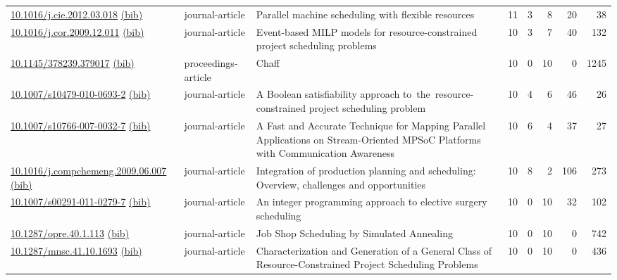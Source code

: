 {\begin{longtable}{p{5cm}lp{11cm}rrrrr}
\href{http://dx.doi.org/10.1016/j.cie.2012.03.018}{10.1016/j.cie.2012.03.018} \href{https://www.doi2bib.org/bib/10.1016/j.cie.2012.03.018}{(bib)} & journal-article & Parallel machine scheduling with flexible resources & 11 & 3 & 8 & 20 & 38 \\
\href{http://dx.doi.org/10.1016/j.cor.2009.12.011}{10.1016/j.cor.2009.12.011} \href{https://www.doi2bib.org/bib/10.1016/j.cor.2009.12.011}{(bib)} & journal-article & Event-based MILP models for resource-constrained project scheduling problems & 10 & 3 & 7 & 40 & 132 \\
\href{http://dx.doi.org/10.1145/378239.379017}{10.1145/378239.379017} \href{https://www.doi2bib.org/bib/10.1145/378239.379017}{(bib)} & proceedings-article & Chaff & 10 & 0 & 10 & 0 & 1245 \\
\href{http://dx.doi.org/10.1007/s10479-010-0693-2}{10.1007/s10479-010-0693-2} \href{https://www.doi2bib.org/bib/10.1007/s10479-010-0693-2}{(bib)} & journal-article & A Boolean satisfiability approach to the resource-constrained project scheduling problem & 10 & 4 & 6 & 46 & 26 \\
\href{http://dx.doi.org/10.1007/s10766-007-0032-7}{10.1007/s10766-007-0032-7} \href{https://www.doi2bib.org/bib/10.1007/s10766-007-0032-7}{(bib)} & journal-article & A Fast and Accurate Technique for Mapping Parallel Applications on Stream-Oriented MPSoC Platforms with Communication Awareness & 10 & 6 & 4 & 37 & 27 \\
\href{http://dx.doi.org/10.1016/j.compchemeng.2009.06.007}{10.1016/j.compchemeng.2009.06.007} \href{https://www.doi2bib.org/bib/10.1016/j.compchemeng.2009.06.007}{(bib)} & journal-article & Integration of production planning and scheduling: Overview, challenges and opportunities & 10 & 8 & 2 & 106 & 273 \\
\href{http://dx.doi.org/10.1007/s00291-011-0279-7}{10.1007/s00291-011-0279-7} \href{https://www.doi2bib.org/bib/10.1007/s00291-011-0279-7}{(bib)} & journal-article & An integer programming approach to elective surgery scheduling & 10 & 0 & 10 & 32 & 102 \\
\href{http://dx.doi.org/10.1287/opre.40.1.113}{10.1287/opre.40.1.113} \href{https://www.doi2bib.org/bib/10.1287/opre.40.1.113}{(bib)} & journal-article & Job Shop Scheduling by Simulated Annealing & 10 & 0 & 10 & 0 & 742 \\
\href{http://dx.doi.org/10.1287/mnsc.41.10.1693}{10.1287/mnsc.41.10.1693} \href{https://www.doi2bib.org/bib/10.1287/mnsc.41.10.1693}{(bib)} & journal-article & Characterization and Generation of a General Class of Resource-Constrained Project Scheduling Problems & 10 & 0 & 10 & 0 & 436 \\

\end{longtable}}
